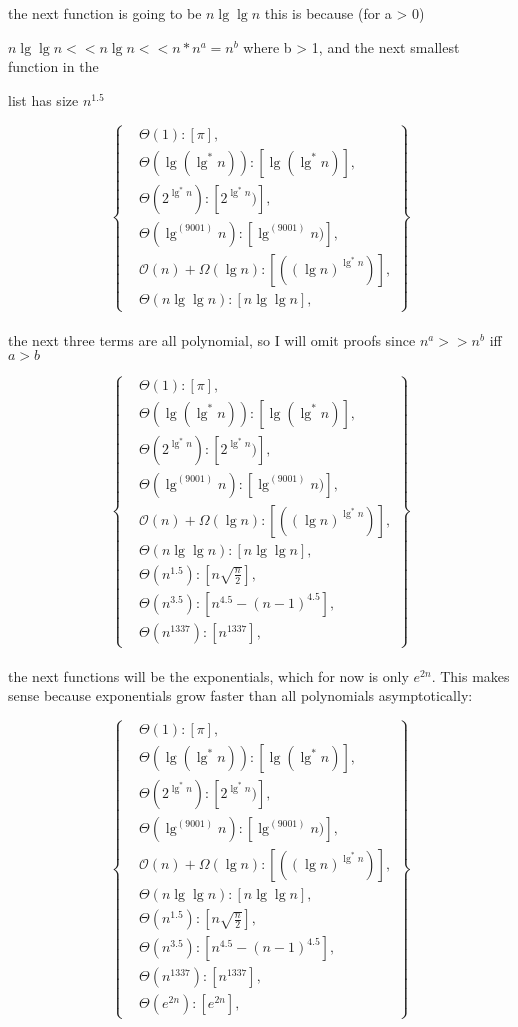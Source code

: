 \documentclass[11pt,fleqn]{article}
\theoremstyle{definition}
\theoremstyle{remark}
\begin{document}
the next function is going to be $n\lg \lg n$ this is because (for a > 0)

$n\lg \lg n << n\lg n << n * n^a = n^b$ where b > 1, and the next smallest function in the 

list has size $n^{1.5}$

\[
\left\{
\begin{aligned}
& \Theta(1): [\pi],\\
& \Theta(\lg(\lg^*n)): [\lg(\lg^*n)],\\
& \Theta(2^{\lg^*n}): [2^{\lg^*n})],\\
& \Theta(\lg^{(9001)} n): [\lg^{(9001)} n)],\\
& \mathcal{O}(n)+\Omega(\lg n): [({(\lg n)}^{\lg^*{n}})],\\
& \Theta(n\lg \lg n): [n\lg \lg n],
\end{aligned}
\right\}
\]\\

the next three terms are all polynomial, so I will omit proofs since
$n^a >> n^b$ iff $a > b$

\[
\left\{
\begin{aligned}
& \Theta(1): [\pi],\\
& \Theta(\lg(\lg^*n)): [\lg(\lg^*n)],\\
& \Theta(2^{\lg^*n}): [2^{\lg^*n})],\\
& \Theta(\lg^{(9001)} n): [\lg^{(9001)} n)],\\
& \mathcal{O}(n)+\Omega(\lg n): [({(\lg n)}^{\lg^*{n}})],\\
& \Theta(n\lg \lg n): [n\lg \lg n],\\
& \Theta(n^{1.5}): [n\sqrt{\frac{n}{2}}],\\
& \Theta(n^{3.5}): [n^{4.5} - (n - 1)^{4.5}],\\ 
&\Theta(n^{1337}): [n^{1337}],
\end{aligned}
\right\}
\]\\

the next functions will be the exponentials, which for now
is only $e^{2n}$. This makes sense because exponentials grow faster
than all polynomials asymptotically:

\[
\left\{
\begin{aligned}
& \Theta(1): [\pi],\\
& \Theta(\lg(\lg^*n)): [\lg(\lg^*n)],\\
& \Theta(2^{\lg^*n}): [2^{\lg^*n})],\\
& \Theta(\lg^{(9001)} n): [\lg^{(9001)} n)],\\
& \mathcal{O}(n)+\Omega(\lg n): [({(\lg n)}^{\lg^*{n}})],\\
& \Theta(n\lg \lg n): [n\lg \lg n],\\
& \Theta(n^{1.5}): [n\sqrt{\frac{n}{2}}],\\
& \Theta(n^{3.5}): [n^{4.5} - (n - 1)^{4.5}],\\ 
& \Theta(n^{1337}): [n^{1337}],\\
& \Theta(e^{2n}): [e^{2n}],
\end{aligned}
\right\}
\]\\
\end{document}
